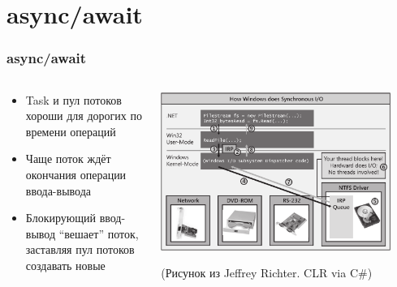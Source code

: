 \documentclass[xetex,mathserif,serif]{beamer}
\begin{document}
	\section{async/await}

	\begin{frame}
		\frametitle{async/await}
		\begin{columns}
			\begin{column}{0.5\textwidth}
				\begin{itemize}
					\item Task и пул потоков хороши для дорогих по времени операций
					\item Чаще поток ждёт окончания операции ввода-вывода
					\item Блокирующий ввод-вывод ``вешает'' поток, заставляя пул потоков создавать новые
				\end{itemize}
			\end{column}
			\begin{column}{0.5\textwidth}
				\begin{center}
					\includegraphics[width=0.9\textwidth]{windowsSynchronousIO.png}
					
					\begin{footnotesize}(Рисунок из Jeffrey Richter. CLR via C\#)\end{footnotesize}
				\end{center}
			\end{column}
		\end{columns}
	\end{frame}
\end{document}
